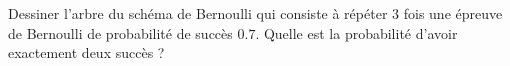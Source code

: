 
\begin{exercice}\label{exoPremiere-0075}

    Dessiner l'arbre du schéma de Bernoulli qui consiste à répéter \( 3\) fois une épreuve de Bernoulli de probabilité de succès \( 0.7\). Quelle est la probabilité d'avoir exactement deux succès ?

\end{exercice}
